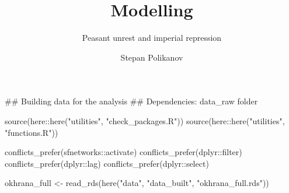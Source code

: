 \documentclass[
  11pt,
  letterpaper,
  DIV=11,
  numbers=noendperiod]{scrartcl}
\title{Modelling}
\subtitle{Peasant unrest and imperial repression}
\author{Stepan Polikanov}
\date{}
\newenvironment{Shaded}{\begin{snugshade}}{\end{snugshade}}
\newcommand{\DocumentationTok}[1]{\textcolor[rgb]{0.64,0.20,0.25}{#1}}
\newcommand{\FunctionTok}[1]{\textcolor[rgb]{0.56,0.27,0.68}{#1}}
\newcommand{\NormalTok}[1]{\textcolor[rgb]{0.81,0.81,0.76}{#1}}
\newcommand{\OtherTok}[1]{\textcolor[rgb]{0.15,0.68,0.38}{#1}}
\newcommand{\SpecialCharTok}[1]{\textcolor[rgb]{0.24,0.68,0.91}{#1}}
\newcommand{\StringTok}[1]{\textcolor[rgb]{0.96,0.31,0.31}{#1}}
\begin{document}
\maketitle


\begin{Shaded}
\begin{Highlighting}[]
\DocumentationTok{\#\# Building data for the analysis}
\DocumentationTok{\#\# Dependencies: data\_raw folder}

\FunctionTok{source}\NormalTok{(here}\SpecialCharTok{::}\FunctionTok{here}\NormalTok{(}\StringTok{"utilities"}\NormalTok{, }\StringTok{"check\_packages.R"}\NormalTok{))}
\FunctionTok{source}\NormalTok{(here}\SpecialCharTok{::}\FunctionTok{here}\NormalTok{(}\StringTok{"utilities"}\NormalTok{, }\StringTok{"functions.R"}\NormalTok{))}

\FunctionTok{conflicts\_prefer}\NormalTok{(sfnetworks}\SpecialCharTok{::}\NormalTok{activate)}
\FunctionTok{conflicts\_prefer}\NormalTok{(dplyr}\SpecialCharTok{::}\NormalTok{filter)}
\FunctionTok{conflicts\_prefer}\NormalTok{(dplyr}\SpecialCharTok{::}\NormalTok{lag)}
\FunctionTok{conflicts\_prefer}\NormalTok{(dplyr}\SpecialCharTok{::}\NormalTok{select)}
\end{Highlighting}
\end{Shaded}

\begin{Shaded}
\begin{Highlighting}[]
\NormalTok{okhrana\_full }\OtherTok{\textless{}{-}} \FunctionTok{read\_rds}\NormalTok{(}\FunctionTok{here}\NormalTok{(}\StringTok{"data"}\NormalTok{, }\StringTok{"data\_built"}\NormalTok{, }\StringTok{"okhrana\_full.rds"}\NormalTok{))}
\end{Highlighting}
\end{Shaded}
\end{document}
